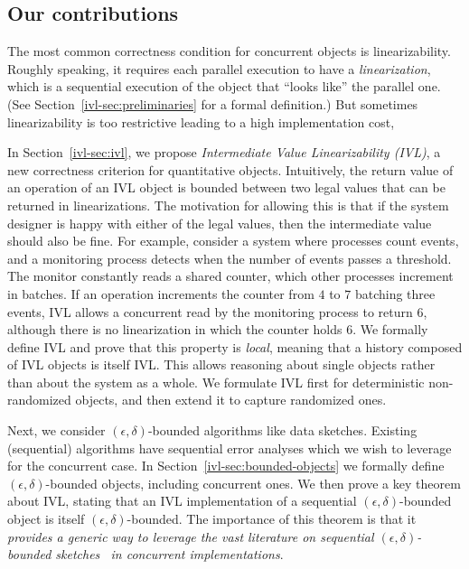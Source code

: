 
\subsection{Our contributions}
\label{ivl-ssec:contribution}

The most common correctness condition for concurrent objects is linearizability. Roughly speaking,
it requires each parallel execution to have a \emph{linearization}, which is a sequential
execution of the object that ``looks like'' the parallel one. (See Section~\ref{ivl-sec:preliminaries} for a formal definition.)
But sometimes linearizability is too restrictive leading to a high implementation cost, 

In Section~\ref{ivl-sec:ivl}, we propose \emph{Intermediate Value Linearizability (IVL)},
a new correctness criterion for quantitative objects.
Intuitively, the return value of an operation
of an IVL object is bounded between two legal values that can be returned in linearizations.
The motivation for allowing this is that if the system designer is happy with
either of the legal values, then the intermediate value should also be fine.
For example, consider a system where processes
count events, and a monitoring process detects when the number of events passes a threshold.
The monitor constantly reads a shared counter, which other processes increment in batches.
If an operation increments the counter from $4$ to $7$
batching three events, IVL allows a concurrent read by the monitoring
process to return $6$, although there is no linearization
in which the counter holds $6$. We formally define IVL and prove that this property is
\emph{local}, meaning that a history composed of IVL objects is itself IVL.
This allows reasoning about single objects rather than about the system as a whole. We formulate
IVL first for deterministic non-randomized objects, and then extend it to capture randomized ones.

Next, we consider $(\epsilon,\delta)$-bounded algorithms like data sketches.
Existing (sequential) algorithms have sequential error analyses which we wish to leverage
for the concurrent case. In Section~\ref{ivl-sec:bounded-objects} we formally define $(\epsilon, \delta)$-bounded
objects, including concurrent ones. We then prove a key theorem about IVL, stating that an IVL
implementation of a sequential $(\epsilon, \delta)$-bounded object
is itself $(\epsilon, \delta)$-bounded. The importance of this theorem is that it \emph{provides a generic way to leverage
the vast literature on sequential $(\epsilon, \delta)$-bounded
sketches~\cite{morris1978counting, flajolet1985approximate, cichon2011approximate, liu2016one, CountMin, agarwal2013mergeable}
in concurrent implementations}.


